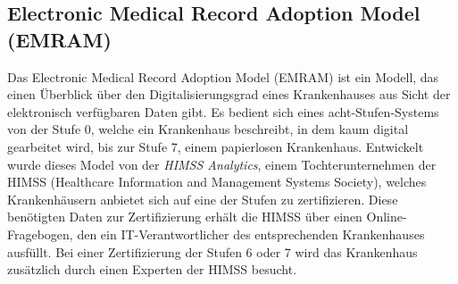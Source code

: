 \subsection{Electronic Medical Record Adoption Model (EMRAM)}
\label{sec:EMRAM}
	Das Electronic Medical Record Adoption Model (EMRAM) ist ein Modell, das einen Überblick über den Digitalisierungsgrad eines Krankenhauses aus Sicht der elektronisch verfügbaren Daten gibt. Es bedient sich eines acht-Stufen-Systems von der Stufe 0, welche ein Krankenhaus beschreibt, in dem kaum digital gearbeitet wird, bis zur Stufe 7, einem papierlosen Krankenhaus. Entwickelt wurde dieses Model von der \textit{HIMSS Analytics}, einem Tochterunternehmen der HIMSS (Healthcare Information and Management Systems Society), welches Krankenhäusern anbietet sich auf eine der Stufen zu zertifizieren. Diese benötigten Daten zur Zertifizierung erhält die HIMSS über einen Online-Fragebogen, den ein IT-Verantwortlicher des entsprechenden Krankenhauses ausfüllt. Bei einer Zertifizierung der Stufen 6 oder 7 wird das Krankenhaus zusätzlich durch einen Experten der HIMSS besucht.

	\parencite{Stephani2019}
